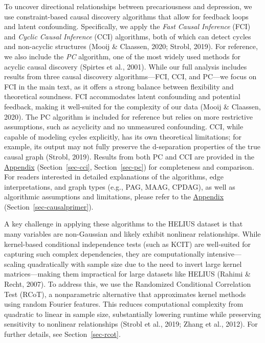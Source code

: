 \documentclass[
]{article}
\begin{document}
To uncover directional relationships between precariousness and
depression, we use constraint-based causal discovery algorithms that
allow for feedback loops and latent confounding. Specifically, we apply
the \emph{Fast Causal Inference} (FCI) and \emph{Cyclic Causal
Inference} (CCI) algorithms, both of which can detect cycles and
non-acyclic structures (Mooij \& Claassen, 2020; Strobl, 2019). For
reference, we also include the \emph{PC} algorithm, one of the most
widely used methods for acyclic causal discovery (Spirtes et al., 2001).
While our full analysis includes results from three causal discovery
algorithms---FCI, CCI, and PC---we focus on FCI in the main text, as it
offers a strong balance between flexibility and theoretical soundness.
FCI accommodates latent confounding and potential feedback, making it
well-suited for the complexity of our data (Mooij \& Claassen, 2020).
The PC algorithm is included for reference but relies on more
restrictive assumptions, such as acyclicity and no unmeasured
confounding. CCI, while capable of modeling cycles explicitly, has its
own theoretical limitations; for example, its output may not fully
preserve the d-separation properties of the true causal graph (Strobl,
2019). Results from both PC and CCI are provided in the
\hyperref[sec-appendix]{Appendix}
(Section~\ref{sec-cci}, Section~\ref{sec-pc}) for completeness and
comparison. For readers interested in detailed explanations of the
algorithms, edge interpretations, and graph types (e.g., PAG, MAAG,
CPDAG), as well as algorithmic assumptions and limitations, please refer
to the \hyperref[sec-appendix]{Appendix}
(Section~\ref{sec-causalprimer}).

A key challenge in applying these algorithms to the HELIUS dataset is
that many variables are non-Gaussian and likely exhibit nonlinear
relationships. While kernel-based conditional independence tests (such
as KCIT) are well-suited for capturing such complex dependencies, they
are computationally intensive---scaling quadratically with sample size
due to the need to invert large kernel matrices---making them
impractical for large datasets like HELIUS (Rahimi \& Recht, 2007). To
address this, we use the Randomized Conditional Correlation Test (RCoT),
a nonparametric alternative that approximates kernel methods using
random Fourier features. This reduces computational complexity from
quadratic to linear in sample size, substantially lowering runtime while
preserving sensitivity to nonlinear relationships (Strobl et al., 2019;
Zhang et al., 2012). For further details, see Section~\ref{sec-rcot}.
\end{document}
